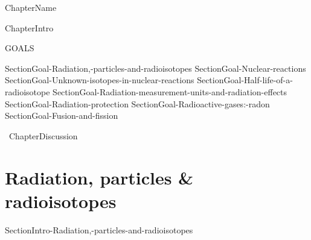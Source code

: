 \documentclass[main.tex]{subfiles}
\newcommand\chapterlabel{Ch-nuclear}\setcounter{figurenewcounter}{0}\setcounter{tablenewcounter}{0}\setcounter{formulanewcounter}{0}
\begin{document}
{ChapterName}\begin{marginfigure}\texttt{[image: ../\{\\chapterlabel]}/figure1} \end{marginfigure}{ChapterIntro}
\begin{marginfigure}%
\begin{mytcbox}{GOALS}
\begin{enumerate}[label=\protect\circled{\color{white}\arabic*}]


{SectionGoal-Radiation,-particles-and-radioisotopes}
{SectionGoal-Nuclear-reactions}
{SectionGoal-Unknown-isotopes-in-nuclear-reactions}
{SectionGoal-Half-life-of-a-radioisotope}
{SectionGoal-Radiation-measurement-units-and-radiation-effects}
{SectionGoal-Radiation-protection}
{SectionGoal-Radioactive-gases:-radon}
{SectionGoal-Fusion-and-fission}

\end{enumerate}
\end{mytcbox}
\vspace{1cm}
\begin{tcolorbox}[enhanced,colback=red!5!white,colframe=black!50!red,boxrule=1pt,
  arc=0pt,outer arc=0pt,drop heavy lifted shadow]
\faGears\ 
{ChapterDiscussion}
\end{tcolorbox}
\end{marginfigure}%






\section{Radiation, particles \& radioisotopes}
{SectionIntro-Radiation,-particles-and-radioisotopes}
\end{document}
